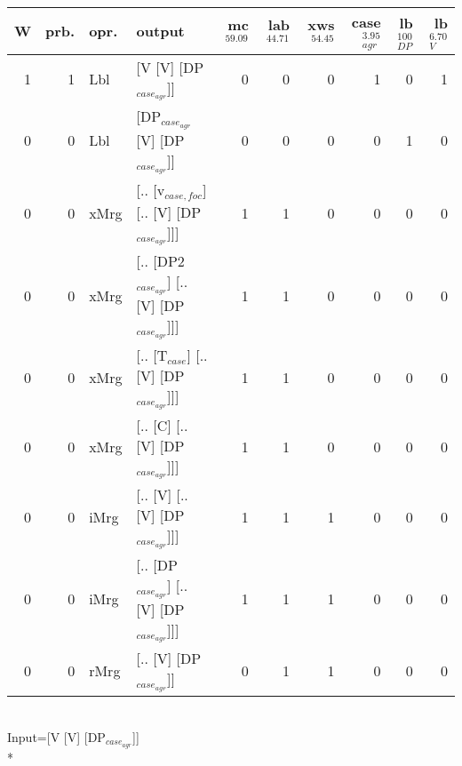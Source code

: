 \begin{tabularx}{\linewidth}{rrlXrrrrrr}
\hline
   W &   prb. & opr.   & output                                     &   mc$^{59.09}$ &   lab$^{44.71}$ &   xws$^{54.45}$ &   case$_{agr}^{3.95}$ &   lb$_{DP}^{100}$ &   lb$_{V}^{6.70}$ \\
\hline
   1 &   1 & Lbl  & [V [V] [DP$_{case_{agr}}$]]                      &            0 &             0 &             0 &                  1 &                0 &              1 \\
   0 &   0 & Lbl  & [DP$_{case_{agr}}$ [V] [DP$_{case_{agr}}$]]            &            0 &             0 &             0 &                  0 &                1 &              0 \\
   0 &   0 & xMrg & [.. [v$_{case,foc}$] [.. [V] [DP$_{case_{agr}}$]]]   &            1 &             1 &             0 &                  0 &                0 &              0 \\
   0 &   0 & xMrg & [.. [DP2$_{case_{agr}}$] [.. [V] [DP$_{case_{agr}}$]]] &            1 &             1 &             0 &                  0 &                0 &              0 \\
   0 &   0 & xMrg & [.. [T$_{case}$] [.. [V] [DP$_{case_{agr}}$]]]       &            1 &             1 &             0 &                  0 &                0 &              0 \\
   0 &   0 & xMrg & [.. [C] [.. [V] [DP$_{case_{agr}}$]]]            &            1 &             1 &             0 &                  0 &                0 &              0 \\
   0 &   0 & iMrg & [.. [V] [.. [V] [DP$_{case_{agr}}$]]]            &            1 &             1 &             1 &                  0 &                0 &              0 \\
   0 &   0 & iMrg & [.. [DP$_{case_{agr}}$] [.. [V] [DP$_{case_{agr}}$]]]  &            1 &             1 &             1 &                  0 &                0 &              0 \\
   0 &   0 & rMrg & [.. [V] [DP$_{case_{agr}}$]]                     &            0 &             1 &             1 &                  0 &                0 &              0 \\
\hline
\end{tabularx}\endgroup\\
\begingroup\scriptsize Input=[V [V] [DP$_{case_{agr}}$]]\\*
